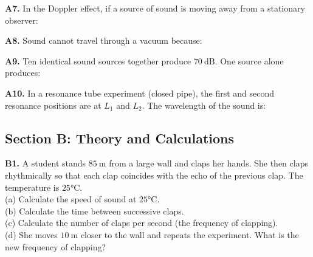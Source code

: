 \begin{exercisebox}[18]

\vspace{0.4cm}

\textbf{A7.} In the Doppler effect, if a source
of sound is moving away from a stationary observer:


\vspace{0.4cm}

\textbf{A8.} Sound cannot travel through a vacuum
because:


\vspace{0.4cm}

\textbf{A9.} Ten identical sound sources together
produce $70\ \text{dB}$. One source alone produces:


\vspace{0.4cm}

\textbf{A10.} In a resonance tube experiment (closed
pipe), the first and second resonance positions are
at $L_1$ and $L_2$. The wavelength of the sound is:


\vspace{0.6cm}

\subsection*{Section B: Theory and Calculations}

\textbf{B1.} A student stands $85\ \text{m}$ from
a large wall and claps her hands. She then claps
rhythmically so that each clap coincides with the
echo of the previous clap. The temperature is
$25°\text{C}$.\\[4pt]
(a) Calculate the speed of sound at $25°\text{C}$.\\
(b) Calculate the time between successive claps.\\
(c) Calculate the number of claps per second
(the frequency of clapping).\\
(d) She moves $10\ \text{m}$ closer to the wall
and repeats the experiment. What is the new frequency
of clapping?
\hfill{}


\end{exercisebox}
